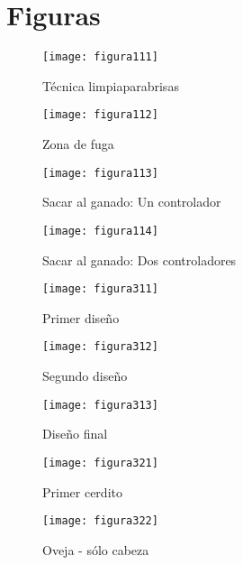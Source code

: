 \section{Figuras}
\label{sec:figuras}


\begin{figure}[h]
\texttt{[image: figura111]}\\
\centering
\caption{Técnica limpiaparabrisas}
\label{fig:figura111}
\end{figure}


\begin{figure}
\texttt{[image: figura112]}\\
\centering
\caption{Zona de fuga}
\label{fig:figura112}
\end{figure}


\begin{figure}
\texttt{[image: figura113]}\\
\centering
\caption{Sacar al ganado: Un controlador}
\label{fig:figura113}
\end{figure}


\begin{figure}
\texttt{[image: figura114]}\\
\centering
\caption{Sacar al ganado: Dos controladores}
\end{figure}


\begin{figure}
\texttt{[image: figura311]}\\
\centering
\caption{Primer diseño}
\end{figure}


\begin{figure}
\texttt{[image: figura312]}\\
\centering
\caption{Segundo diseño}
\end{figure}


\begin{figure}
\texttt{[image: figura313]}\\
\centering
\caption{Diseño final}
\end{figure}


\begin{figure}
\texttt{[image: figura321]}\\
\centering
\caption{Primer cerdito}
\end{figure}


\begin{figure}
\texttt{[image: figura322]}\\
\centering
\caption{Oveja - sólo cabeza}
\end{figure}


